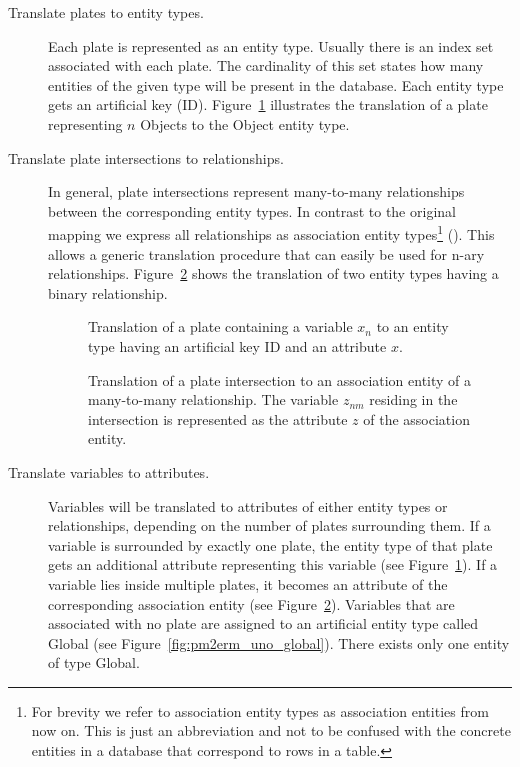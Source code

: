 \begin{description}
\item[Translate plates to entity types.] Each plate is represented as an entity type. Usually there is an index set associated with each plate. The cardinality of this set states how many entities of the given type will be present in the database. Each entity type gets an artificial key (ID). Figure~\ref{fig:pm2erm_uno_local} illustrates the translation of a plate representing $n$ Objects to the Object entity type.

\item[Translate plate intersections to relationships.] In general, plate intersections represent many-to-many relationships between the corresponding entity types. In contrast to the original mapping we express all relationships as association entity types\footnote{For brevity we refer to association entity types as association entities from now on. This is just an abbreviation and not to be confused with the concrete entities in a database that correspond to rows in a table.} (\cite[p.~86-88]{elmasri2007database}). This allows a generic translation procedure that can easily be used for n-ary relationships. Figure~\ref{fig:pm2erm_bi_noconstraints} shows the translation of two entity types having a binary relationship.

\begin{figure}[t]
\centering
\scalebox{\tikzScale}{\adjustTikzSize }
\caption[Translation of a plate containing a single variable to an ERM]{Translation of a plate containing a variable $x_n$ to an entity type having an artificial key ID and an attribute $x$.}\label{fig:pm2erm_uno_local}
\end{figure}

\begin{figure}[t]
\centering
\scalebox{\tikzScale}{\adjustTikzSize }
\caption[Translation of a plate intersection to an ERM]{Translation of a plate intersection to an association entity of a many-to-many relationship. The variable $z_{nm}$ residing in the intersection is represented as the attribute $z$ of the association entity.}\label{fig:pm2erm_bi_noconstraints}
\end{figure}

\item[Translate variables to attributes.] Variables will be translated to attributes of either entity types or relationships, depending on the number of plates surrounding them. If a variable is surrounded by exactly one plate, the entity type of that plate gets an additional attribute representing this variable (see Figure~\ref{fig:pm2erm_uno_local}). If a variable lies inside multiple plates, it becomes an attribute of the corresponding association entity (see Figure~\ref{fig:pm2erm_bi_noconstraints}). Variables that are associated with no plate are assigned to an artificial entity type called Global (see Figure~\ref{fig:pm2erm_uno_global}). There exists only one entity of type Global.


\end{description}
